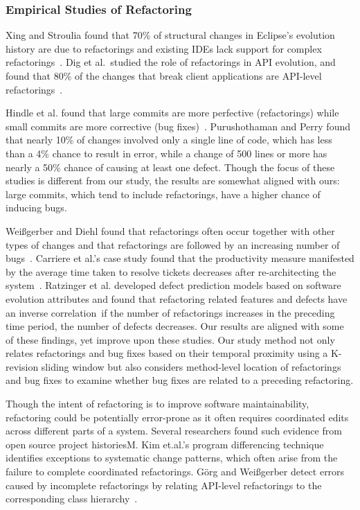 \documentclass[runningheads,a4paper]{llncs}
\begin{document}
\subsubsection{Empirical Studies of Refactoring} 

Xing and Stroulia found that 70\% of structural changes in Eclipse's evolution history are due to refactorings and existing IDEs lack support for complex refactorings~\cite{Xing2005}. Dig et al.~studied the role of refactorings in API evolution, and found that 80\% of the changes that break client applications are API-level refactorings~\cite{Dig2005}. 

Hindle et al. found that large commits are more perfective (refactorings) while small commits are more corrective (bug fixes)~\cite{Hindle2008}. Purushothaman and Perry found that nearly 10\% of changes involved only a single line of code, which has less than a 4\% chance to result in error, while a change of 500 lines or more has nearly a 50\% chance of causing at least one defect. Though the focus of these studies is different from our study, the results are somewhat aligned with ours: large commits, which tend to include refactorings, have a higher chance of inducing bugs. 

Wei{\ss}gerber and Diehl found that refactorings often occur together with other types of changes and that refactorings are followed by an increasing number of bugs~\cite{Weissgerber2006:refactor}. Carriere et al.'s case study found that the productivity measure manifested by the average time taken to resolve tickets decreases after re-architecting the system~\cite{Carriere2010:architecture}. 
Ratzinger et al. developed defect prediction models based on software evolution attributes and found that refactoring related features and defects have an inverse correlation~\cite{Ratzinger2008:refactor}\textemdash if the number of refactorings increases in the preceding time period, the number of defects decreases.   Our results are aligned with some of these findings, yet improve upon these studies. Our study method not only relates refactorings and bug fixes based on their temporal proximity using a K-revision sliding window but also considers method-level location of refactorings and bug fixes to examine whether bug fixes are related to a preceding refactoring. 

Though the intent of refactoring is to improve software maintainability, refactoring could be potentially error-prone as it often requires coordinated edits across different parts of a system. Several researchers found such evidence from open source project histories\textemdash M. Kim et.al.'s program differencing technique~\cite{Kim2007, Kim2009} identifies exceptions to systematic change patterns, which often arise from the failure to complete coordinated refactorings. G{\"o}rg and Wei{\ss}gerber detect errors caused by incomplete refactorings by relating API-level refactorings to the corresponding class hierarchy~\cite{Weissgerber2006:refactor}. 
\end{document}
